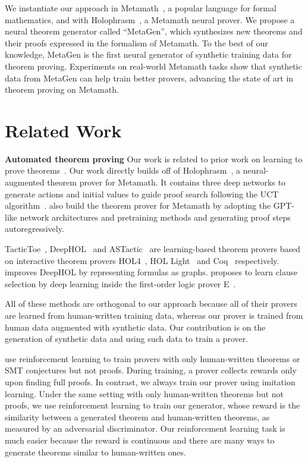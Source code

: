 \documentclass{article}
\begin{document}
We instantiate our approach in Metamath~\citep{metamath}, a popular language for formal mathematics, and with Holophrasm~\citep{whalen2016holophrasm}, a Metamath neural prover. We propose a neural theorem generator called ``MetaGen'', which synthesizes new theorems and their proofs expressed in the formalism of Metamath. 
To the best of our knowledge, MetaGen is the first neural generator of synthetic training data for theorem proving. 
Experiments on real-world Metamath tasks show that synthetic data from MetaGen can help train better provers, advancing the state of art in theorem proving on Metamath. 

\section{Related Work}
\noindent\textbf{Automated theorem proving}
Our work is related to prior work on learning to prove theorems~\citep{whalen2016holophrasm,gauthier2018tactictoe,bansal2019holist,yang2019coqgym,loos2017deep,balunovic2018learning,kaliszyk2018reinforcement,bansal2019learning,polu2020generative}.
Our work directly builds off of Holophrasm~\citep{whalen2016holophrasm}, 
a neural-augmented theorem prover for Metamath.
It contains three deep networks 
to generate actions and initial values
to guide proof search following the UCT algorithm~\citep{kocsis2006bandit}. 
\citet{polu2020generative} also build the theorem prover for Metamath by adopting the GPT-like network architectures and pretraining methods and generating proof steps autoregressively. 

TacticToe~\citep{gauthier2018tactictoe}, DeepHOL~\citep{bansal2019holist} and ASTactic~\citep{yang2019coqgym} 
are learning-based theorem provers based on  interactive theorem provers
HOL4~\citep{slind2008brief}, HOL Light~\citep{harrison-hollight} and Coq~\citep{bertot2004coq} respectively. 
\citet{paliwal2019graph} improves DeepHOL by representing formulas as graphs.
\citet{loos2017deep} proposes to learn clause selection by deep learning inside the first-order logic prover E~\citep{schulz2002brainiac}. 

All of these methods are orthogonal to our approach because all of their provers are learned from human-written training data, whereas our prover is trained from human data augmented with synthetic data. Our contribution is on the generation of synthetic data and using such data to train a prover. 

\citet{kaliszyk2018reinforcement,bansal2019holist,bansal2019learning, balunovic2018learning} use reinforcement learning to train provers with  only human-written theorems or SMT conjectures but not proofs. 
During training, a prover collects rewards only upon finding full proofs. 
In contrast, we always train our prover using imitation learning. 
Under the same setting with only human-written theorems but not proofs, we use reinforcement learning to train our generator, whose reward is the similarity between a generated theorem and human-written theorems, as measured by an adversarial discriminator. Our reinforcement learning task is much easier because the reward is continuous and there are many ways to generate theorems similar to human-written ones. 
\end{document}
